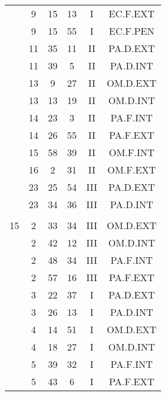 \documentclass[12pt, a4paper]{article}
\begin{document}
\begin{multicols}{3}
{\begin{tabular}{c c c c c c}
	 	 	 	 & 9 & 15 & 13 & I & EC.F.EXT\\%
	 	 	 	 & 9 & 15 & 55 & I & EC.F.PEN\\%
	 	 	 	 & 11 & 35 & 11 & II & PA.D.EXT\\%
	 	 	 	 & 11 & 39 & 5 & II & PA.D.INT\\%
	 	 	 	 & 13 & 9 & 27 & II & OM.D.EXT\\%
	 	 	 	 & 13 & 13 & 19 & II & OM.D.INT\\%
	 	 	 	 & 14 & 23 & 3 & II & PA.F.INT\\%
	 	 	 	 & 14 & 26 & 55 & II & PA.F.EXT\\%
	 	 	 	 & 15 & 58 & 39 & II & OM.F.INT\\%
	 	 	 	 & 16 & 2 & 31 & II & OM.F.EXT\\%
	 	 	 	 & 23 & 25 & 54 & III & PA.D.EXT\\%
	 	 	 	 & 23 & 34 & 36 & III & PA.D.INT\\%
	 	 	 	 & & & & & \\%
	 	 	 	15 & 2 & 33 & 34 & III & OM.D.EXT\\%
	 	 	 	 & 2 & 42 & 12 & III & OM.D.INT\\%
	 	 	 	 & 2 & 48 & 34 & III & PA.F.INT\\%
	 	 	 	 & 2 & 57 & 16 & III & PA.F.EXT\\%
	 	 	 	 & 3 & 22 & 37 & I & PA.D.EXT\\%
	 	 	 	 & 3 & 26 & 13 & I & PA.D.INT\\%
	 	 	 	 & 4 & 14 & 51 & I & OM.D.EXT\\%
	 	 	 	 & 4 & 18 & 27 & I & OM.D.INT\\%
	 	 	 	 & 5 & 39 & 32 & I & PA.F.INT\\%
	 	 	 	 & 5 & 43 & 6 & I & PA.F.EXT\\%

\end{tabular}}
\end{multicols}
\end{document}
